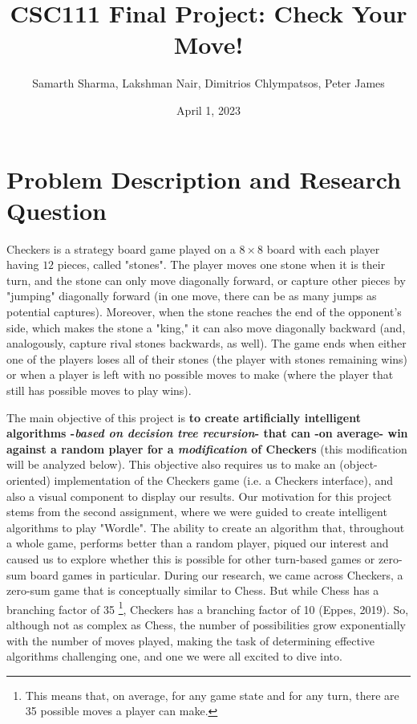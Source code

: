 \documentclass[fontsize=11pt]{article}
\title{CSC111 Final Project: \textbf{Check Your Move!}}
\date{April 1, 2023}
\author{Samarth Sharma, Lakshman Nair, Dimitrios Chlympatsos, Peter James}
\begin{document}
\maketitle



\section*{Problem Description and Research Question}


Checkers is a strategy board game played on a $8 \times 8$ board with each player having $12$ pieces, called "stones". The player moves one stone when it is their turn, and the stone can only move diagonally forward, or capture other pieces by "jumping" diagonally forward (in one move, there can be as many jumps as potential captures). Moreover, when the stone reaches the end of the opponent's side, which makes the stone a "king," it can also move diagonally backward (and, analogously, capture rival stones backwards, as well). The game ends when either one of the players loses all of their stones (the player with stones remaining wins) or when a player is left with no possible moves to make (where the player that still has possible moves to play wins).

The main objective of this project is \textbf{to create artificially intelligent algorithms -\textit{based on decision tree recursion}- that can -on average- win against a random player for a \textit{modification} of Checkers} (this modification will be analyzed below). This objective also requires us to make an (object-oriented) implementation of the Checkers game (i.e. a Checkers interface), and also a visual component to display our results. Our motivation for this project stems from the second assignment, where we were guided to create intelligent algorithms to play "Wordle". The ability to create an algorithm that, throughout a whole game, performs better than a random player, piqued our interest and caused us to explore whether this is possible for other turn-based games or zero-sum board games in particular. During our research, we came across Checkers, a zero-sum game that is conceptually similar to Chess. But while Chess has a branching factor of 35 \footnote{This means that, on average, for any game state and for any turn, there are 35 possible moves a player can make.}, Checkers has a branching factor of 10 (Eppes, 2019). So, although not as complex as Chess, the number of possibilities grow exponentially with the number of moves played, making the task of determining effective algorithms challenging one, and one we were all excited to dive into.
\end{document}
